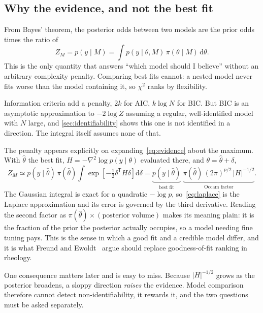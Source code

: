 \documentclass[10pt]{article}
\begin{document}
\subsection{Why the evidence, and not the best fit}

From Bayes' theorem, the posterior odds between two models are the prior odds times the
ratio of
%
\begin{equation}
Z_M = p(y \mid M) = \int p(y \mid \theta, M)\,\pi(\theta \mid M)\,\mathrm{d}\theta .
\label{eq:evidence}
\end{equation}
%
This is the only quantity that answers ``which model should I believe'' without an arbitrary
complexity penalty. Comparing best fits cannot: a nested model never fits worse than the model
containing it, so $\chi^2$ ranks by flexibility.

Information criteria add a penalty, $2k$ for AIC, $k\log N$ for BIC. But BIC is an
asymptotic approximation to $-2\log Z$ assuming a regular, well-identified model with $N$
large, and \cref{sec:identifiability} shows this one is not identified in a direction. The
integral itself assumes none of that.

The penalty appears explicitly on expanding~\eqref{eq:evidence} about the maximum. With
$\hat\theta$ the best fit, $H = -\nabla^2\log p(y\mid\theta)$ evaluated there, and
$\theta = \hat\theta + \delta$,
%
\begin{equation}
Z_M \simeq p(y\mid\hat\theta)\,\pi(\hat\theta)\int
  \exp\!\left[-\tfrac12\delta^{\mathsf T}H\delta\right]\mathrm{d}\delta
= \underbrace{p(y\mid\hat\theta)}_{\text{best fit}}\;
  \underbrace{\pi(\hat\theta)\,(2\pi)^{p/2}\,|H|^{-1/2}}_{\text{Occam factor}} .
\label{eq:laplace}
\end{equation}
%
The Gaussian integral is exact for a quadratic $-\log p$, so~\eqref{eq:laplace} is the
Laplace approximation and its error is governed by the third derivative. Reading the second
factor as $\pi(\hat\theta)\times(\text{posterior volume})$ makes its meaning plain: it is
the fraction of the prior the posterior actually occupies, so a model needing fine tuning
pays. This is the sense in which a good fit and a credible model differ, and it is what
Freund and Ewoldt~\citep{freund2015quantitative} argue should replace goodness-of-fit ranking in rheology.

One consequence matters later and is easy to miss. Because $|H|^{-1/2}$ grows as the
posterior broadens, a sloppy direction \emph{raises} the evidence. Model comparison
therefore cannot detect non-identifiability, it rewards it, and the two questions must
be asked separately.
\end{document}
